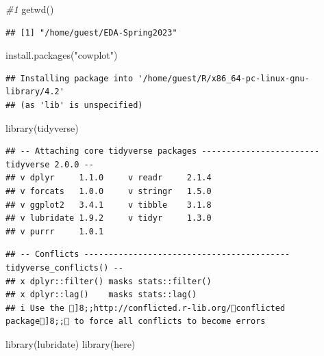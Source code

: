\documentclass[
]{article}
\newenvironment{Shaded}{\begin{snugshade}}{\end{snugshade}}
\newcommand{\CommentTok}[1]{\textcolor[rgb]{0.56,0.35,0.01}{\textit{#1}}}
\newcommand{\FunctionTok}[1]{\textcolor[rgb]{0.00,0.00,0.00}{#1}}
\newcommand{\NormalTok}[1]{#1}
\newcommand{\StringTok}[1]{\textcolor[rgb]{0.31,0.60,0.02}{#1}}
\begin{document}
\begin{Shaded}
\begin{Highlighting}[]
\CommentTok{\#1 }
\FunctionTok{getwd}\NormalTok{()}
\end{Highlighting}
\end{Shaded}

\begin{verbatim}
## [1] "/home/guest/EDA-Spring2023"
\end{verbatim}

\begin{Shaded}
\begin{Highlighting}[]
\FunctionTok{install.packages}\NormalTok{(}\StringTok{"cowplot"}\NormalTok{)}
\end{Highlighting}
\end{Shaded}

\begin{verbatim}
## Installing package into '/home/guest/R/x86_64-pc-linux-gnu-library/4.2'
## (as 'lib' is unspecified)
\end{verbatim}

\begin{Shaded}
\begin{Highlighting}[]
\FunctionTok{library}\NormalTok{(tidyverse)}
\end{Highlighting}
\end{Shaded}

\begin{verbatim}
## -- Attaching core tidyverse packages ------------------------ tidyverse 2.0.0 --
## v dplyr     1.1.0     v readr     2.1.4
## v forcats   1.0.0     v stringr   1.5.0
## v ggplot2   3.4.1     v tibble    3.1.8
## v lubridate 1.9.2     v tidyr     1.3.0
## v purrr     1.0.1
\end{verbatim}

\begin{verbatim}
## -- Conflicts ------------------------------------------ tidyverse_conflicts() --
## x dplyr::filter() masks stats::filter()
## x dplyr::lag()    masks stats::lag()
## i Use the ]8;;http://conflicted.r-lib.org/conflicted package]8;; to force all conflicts to become errors
\end{verbatim}

\begin{Shaded}
\begin{Highlighting}[]
\FunctionTok{library}\NormalTok{(lubridate)}
\FunctionTok{library}\NormalTok{(here)}
\end{Highlighting}
\end{Shaded}
\end{document}
